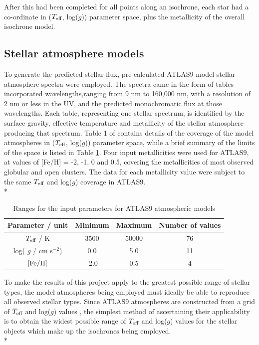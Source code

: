 \documentclass[12pt, a4paper]{report}
\begin{document}
After this had been completed for all points along an isochrone, each star had a co-ordinate in ($T_{\textnormal{eff}}$, log($g$)) parameter space, plus the metallicity of the overall isochrone model.

\subsection{Stellar atmosphere models}
To generate the predicted stellar flux, pre-calculated ATLAS9 model stellar atmosphere spectra \citep{1993KurCD..13.....K} were employed. The spectra came in the form of tables incorporated wavelengths,ranging from 9 nm to 160,000 nm, with a resolution of 2 nm or less in the UV, and the predicted monochromatic flux at those wavelengths. Each table, representing one stellar spectrum, is identified by the surface gravity, effective temperature and metallicity of the stellar atmosphere producing that spectrum. Table 1 of \cite{2004astro.ph..5087C} contains details of the coverage of the model atmospheres in ($T_{\textnormal{eff}}$, log($g$)) parameter space, while a brief summary  of the limits of the space is listed in Table \ref{atlas9_input}. Four input metallicities were used for ATLAS9, at values of [Fe/H] = -2, -1, 0 and 0.5, covering the metallicities of most observed globular and open clusters. The data for each metallicity value were subject to the same $T_{\textnormal{eff}}$ and log($g$) coverage in ATLAS9.\\*

\begin{table}
\begin{center}
\begin{tabular}{cccc}
\hline
Parameter / unit & Minimum & Maximum & Number of values \\
\hline
$T_{\textnormal{eff}}$ / K & 3500 & 50000 & 76 \\
log( $g$ / cm s$^{-2}$) & 0.0 & 5.0 & 11 \\
$\textnormal{[Fe/H]}$ & -2.0 & 0.5 & 4 \\
\hline
\end{tabular}
\caption{Ranges for the input parameters for ATLAS9 atmospheric models}
\label{atlas9_input}
\end{center}
\end{table}

To make the results of this project apply to the greatest possible range of stellar types, the model atmospheres being employed must ideally be able to reproduce all observed stellar types. Since ATLAS9 atmospheres are constructed from a grid of $T_{\textnormal{eff}}$ and log($g$) values \citep{2004astro.ph..5087C}, the simplest method of ascertaining their applicability is to obtain the widest possible range of $T_{\textnormal{eff}}$ and log($g$) values for the stellar objects which make up the isochrones being employed.\\*
\end{document}
